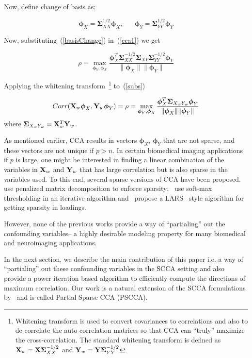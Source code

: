 \documentclass{llncs}
\newcommand{\X}{{\bf X}}
\newcommand{\Y}{{\bf Y}}
\newcommand{\bs}{\boldsymbol}
\newcommand{\bSigma}{\boldsymbol \Sigma}
\begin{document}
Now, define change of basis as:

\begin{equation}
\label{basisChange}
\bs\phi_X = \bSigma_{XX}^{1/2}\bs\phi_X, \;\;\;\;\;\;   \bs\phi_Y = \bSigma_{YY}^{1/2}\bs\phi_Y 
\end{equation}

Now, substituting~(\ref{basisChange}) in~(\ref{cca1}) we get 

\begin{equation}
\label{subs}
\rho= \max_{{\bs\phi_Y}, {\bs\phi_X}} \frac{\bs\phi_X^T \bSigma_{XX}^{-1/2}\bSigma_{XY}\bSigma_{YY}^{-1/2}\bs\phi_Y}{\|\bs\phi_X\| \|\bs\phi_Y\|}
\end{equation}

Applying the whitening transform~\footnote{Whitening transform is used to convert covariances to correlations and also to de-correlate the auto-correlation matrices so that CCA can ``truly'' maximize the cross-correlation. The standard whitening transform is defined as $\X_w= \X\bSigma_{XX}^{-1/2}$ and $\Y_w= \Y\bSigma_{YY}^{-1/2}$} to~(\ref{subs})

\begin{equation}
\label{simplifiedcca}
Corr(\X_w\bs\phi_X,\Y_w\bs\phi_Y)=\rho=\max_{{\bs\phi_Y}, {\bs\phi_X}} \frac{\bs\phi_X^T \bSigma_{X_wY_w}\bs\phi_Y}{\|\bs\phi_X\| \|\bs\phi_Y\|}
\end{equation}
where $\bSigma_{X_wY_w} = \X_w^T\Y_w$. 

As mentioned earlier, CCA results in vectors $\bs\phi_X$, $\bs\phi_Y$ that are not sparse, and these vectors are not unique if $p > n$. In certain biomedical imaging applications if $p$ is large, one might be interested in finding a linear combination of the variables in $\X_w$ and $\Y_w$ that has large correlation but is also sparse in the variables used. To this end, several sparse versions of CCA have been proposed. ~\cite{parkhomenko} use penalized matrix decomposition to enforce sparsity;~\cite{parkhomenko} use soft-max thresholding in an iterative algorithm and~\cite{lykou} propose a LARS~\cite{lars} style algorithm for getting sparsity in loadings.

However, none of the previous works provide a way of ``partialing'' out the confounding variables-- a highly desirable modeling property for many biomedical and neuroimaging applications. 

In the next section, we describe the main contribution of this paper i.e. a way of ``partialing'' out these confounding variables in the SCCA setting and also provide a power iteration based algorithm to efficiently compute the directions of maximum correlation. Our work is a natural extension of the SCCA formulations by~\cite{parkhomenko,witten} and is called Partial Sparse CCA (PSCCA).
\end{document}
